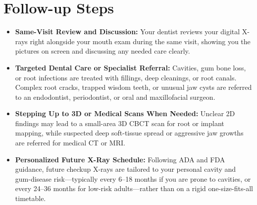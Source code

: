 \section{Follow-up Steps}
\begin{itemize}
\item \textbf{Same-Visit Review and Discussion:} Your dentist reviews your digital X-rays right alongside your mouth exam during the same visit, showing you the pictures on screen and discussing any needed care clearly.
\item \textbf{Targeted Dental Care or Specialist Referral:} Cavities, gum bone loss, or root infections are treated with fillings, deep cleanings, or root canals. Complex root cracks, trapped wisdom teeth, or unusual jaw cysts are referred to an endodontist, periodontist, or oral and maxillofacial surgeon.
\item \textbf{Stepping Up to 3D or Medical Scans When Needed:} Unclear 2D findings may lead to a small-area 3D CBCT scan for root or implant mapping, while suspected deep soft-tissue spread or aggressive jaw growths are referred for medical CT or MRI.
\item \textbf{Personalized Future X-Ray Schedule:} Following ADA and FDA guidance, future checkup X-rays are tailored to your personal cavity and gum-disease risk---typically every 6--18 months if you are prone to cavities, or every 24--36 months for low-risk adults---rather than on a rigid one-size-fits-all timetable.
\end{itemize}

